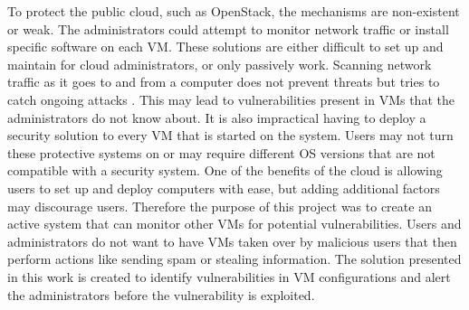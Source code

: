 \documentclass[12pt]{article}
\begin{document}
To protect the public cloud, such as OpenStack, the mechanisms are non-existent or weak. The administrators could attempt to monitor network traffic or install specific software on each VM. These solutions are either difficult to set up and maintain for cloud administrators, or only passively work. Scanning network traffic as it goes to and from a computer does not prevent threats but tries to catch ongoing attacks \cite{webster2006experience}. This may lead to vulnerabilities present in VMs that the administrators do not know about. It is also impractical having to deploy a security solution to every VM that is started on the system. Users may not turn these protective systems on or may require different OS versions that are not compatible with a security system. One of the benefits of the cloud is allowing users to set up and deploy computers with ease, but adding additional factors may discourage users. Therefore the purpose of this project was to create an active system that can monitor other VMs for potential vulnerabilities. Users and administrators do not want to have VMs taken over by malicious users that then perform actions like sending spam or stealing information. The solution presented in this work is created to identify vulnerabilities in VM configurations and alert the administrators before the vulnerability is exploited.
\end{document}
